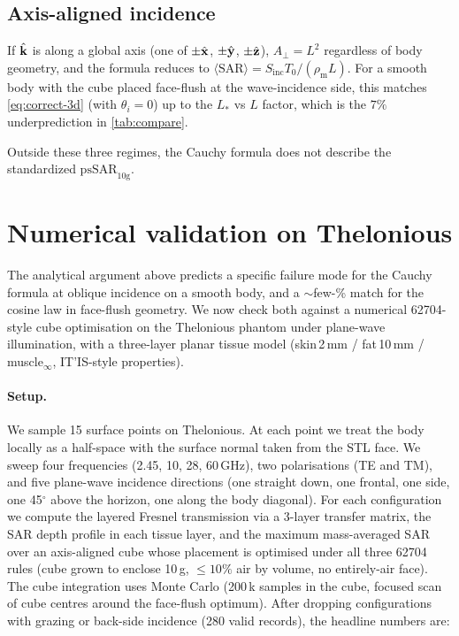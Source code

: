 \documentclass[11pt,a4paper]{article}
\theoremstyle{definition}
\theoremstyle{remark}
\newcommand{\Sinc}{S_{\mathrm{inc}}}
\newcommand{\Tzero}{T_0}
\newcommand{\khat}{\hat{\vb{k}}}
\newcommand{\SAR}{\ensuremath{\mathrm{SAR}}}
\newcommand{\psSAR}{\ensuremath{\mathrm{psSAR}_{10\mathrm{g}}}}
\newcommand{\rhom}{\rho_{\mathrm{m}}}
\newcommand{\Lact}{L_{\!*}}
\begin{document}
\subsection{Axis-aligned incidence}\label{sec:axisaligned}

If $\khat$ is along a global axis (one of $\pm\hat{\vb x}$,
$\pm\hat{\vb y}$, $\pm\hat{\vb z}$), $A_\perp = L^2$ regardless of
body geometry, and the formula reduces to
$\langle\SAR\rangle = \Sinc\Tzero/(\rhom L)$. For a smooth body with
the cube placed face-flush at the wave-incidence side, this matches
\cref{eq:correct-3d} (with $\theta_i=0$) up to the $\Lact$ vs $L$
factor, which is the $7\%$ underprediction in \cref{tab:compare}.

\medskip\noindent
Outside these three regimes, the Cauchy formula does not describe
the standardized $\psSAR$.


\section{Numerical validation on Thelonious}
\label{sec:numerics-thelonious}

The analytical argument above predicts a specific failure mode for the
Cauchy formula at oblique incidence on a smooth body, and a $\sim$few-\%
match for the cosine law in face-flush geometry. We now check both
against a numerical 62704-style cube optimisation on the
Thelonious phantom under plane-wave illumination, with a three-layer
planar tissue model (skin\,2\,mm / fat\,10\,mm / muscle$_\infty$,
IT'IS-style properties).

\paragraph{Setup.} We sample 15 surface points on Thelonious. At each
point we treat the body locally as a half-space with the surface normal
taken from the STL face. We sweep four frequencies (2.45, 10, 28,
60\,GHz), two polarisations (TE and TM), and five plane-wave incidence
directions (one straight down, one frontal, one side, one 45$^\circ$
above the horizon, one along the body diagonal). For each
configuration we compute the layered Fresnel transmission via a 3-layer
transfer matrix, the SAR depth profile in each tissue layer, and the
maximum mass-averaged SAR over an axis-aligned cube whose placement is
optimised under all three 62704 rules (cube grown to enclose 10\,g,
$\le 10\%$ air by volume, no entirely-air face). The cube integration
uses Monte Carlo (200\,k samples in the cube, focused scan of cube
centres around the face-flush optimum).
After dropping configurations with grazing or back-side incidence
(280 valid records), the headline numbers are:
\end{document}
